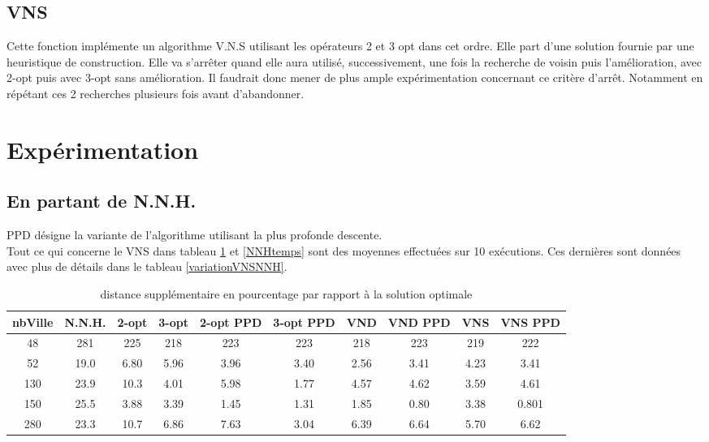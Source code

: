 \documentclass[12pt,a4paper]{article}
\begin{document}
\subsection{VNS}

Cette fonction implémente un algorithme V.N.S utilisant les opérateurs 2 et 3 opt dans cet ordre. Elle part d'une solution fournie par une heuristique de construction. Elle va s’arrêter quand elle aura utilisé, successivement, une fois la recherche de voisin puis l'amélioration, avec 2-opt puis avec 3-opt sans amélioration. Il faudrait donc mener de plus ample expérimentation concernant ce critère d’arrêt. Notamment en répétant ces 2 recherches plusieurs fois avant d'abandonner.

\section{Expérimentation}
\subsection{En partant de N.N.H.}
PPD désigne la variante de l'algorithme utilisant la plus profonde descente.\\
Tout ce qui concerne le VNS dans tableau \ref{NNHpourcentageperf} et \ref{NNHtemps} sont des moyennes effectuées sur 10 exécutions. Ces dernières sont données avec plus de détails dans le tableau \ref{variationVNSNNH}.\\

\begin{table}[!h]
\leftskip -1cm
{
\begin{tabular}{|*{10}{c|}}
  \hline
  nbVille & N.N.H. & 2-opt & 3-opt & 2-opt PPD & 3-opt PPD & VND & VND PPD & VNS & VNS PPD \\
  \hline
  48 & 281 & 225 & 218 & 223 & 223 & 218 & 223 & 219 & 222 \\
  52 & 19.0 & 6.80 & 5.96 & 3.96 & 3.40 & 2.56 & 3.41 & 4.23 & 3.41 \\
  130 & 23.9 & 10.3 & 4.01 & 5.98 & 1.77 & 4.57 & 4.62 & 3.59 & 4.61 \\
  150 & 25.5 & 3.88 & 3.39 & 1.45 & 1.31 & 1.85 & 0.80 & 3.38 & 0.801 \\
  280 & 23.3 & 10.7 & 6.86 & 7.63 & 3.04 & 6.39 & 6.64 & 5.70 & 6.62 \\
  \hline
\end{tabular}
}
\caption{distance supplémentaire en pourcentage par rapport à la solution optimale}
\label{NNHpourcentageperf}
\end{table}
\end{document}

